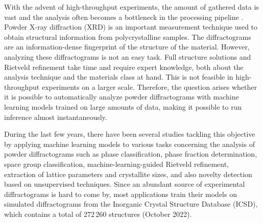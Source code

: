 With the advent of high-throughput experiments, the amount of gathered data is
vast and the analysis often becomes a bottleneck in the processing pipeline
\supercite{rahmanianEnablingModularAutonomous2022}. Powder X-ray diffraction
(XRD) is an important measurement technique used to obtain structural
information from polycrystalline samples\supercite{harrisContemporaryAdvancesUse2001}. 
The diffractograms are an
information-dense fingerprint of the structure of the material. However,
analyzing these diffractograms is not an easy task\supercite{holderTutorialPowderXray2019}. 
Full structure solutions and
Rietveld refinement take time and require expert knowledge, both about the
analysis technique and the materials class at hand. This is not feasible in high-throughput experiments on a larger
scale. Therefore, the question arises whether it is possible to automatically 
analyze powder diffractograms with machine learning models trained on large
amounts of data, making it possible to run inference almost instantaneously.

During the last few years, there have been several studies tackling this
objective by applying machine learning models to various tasks concerning the
analysis of powder diffractograms such as phase
classification\supercite{leeDeeplearningTechniquePhase2020,maffettoneCrystallographyCompanionAgent2021,schuetzkeEnhancingDeeplearningTraining2021,szymanskiProbabilisticDeepLearning2021,wangRapidIdentificationXray2020},
phase fraction determination\supercite{leeDatadrivenXRDAnalysis2021}, space
group
classification\supercite{parkClassificationCrystalStructure2017,oviedoFastInterpretableClassification2019,zalogaCrystalSymmetryClassification2020,vecseiNeuralNetworkBased2019,suzukiSymmetryPredictionKnowledge2020,chakrabortyDeepCrystalStructure2022},
machine-learning-guided Rietveld
refinement\supercite{ozakiAutomatedCrystalStructure2020,fengMethodArtificialIntelligence2019},
extraction of lattice
parameters\supercite{dongDeepConvolutionalNeural2021,chitturiAutomatedPredictionLattice2021,chakrabortyDeepCrystalStructure2022,
habershonPowderDiffractionIndexing2004} and crystallite
sizes\supercite{dongDeepConvolutionalNeural2021,chakrabortyDeepCrystalStructure2022},
and also novelty detection based on unsupervised techniques\supercite{bankoDeepLearningVisualization2021}.
Since an abundant source of experimental diffractograms is hard to come by, most
applications train their models on simulated diffractograms from the Inorganic
Crystal Structure Database (ICSD)\supercite{bergerhoff1987}, which contains a total of 272\,260 structures (October 2022).

